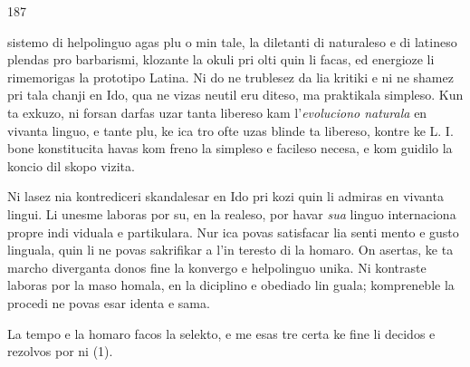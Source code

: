 \begin{VUpage}[191]{187}

\VUcontinue
sistemo di helpolinguo agas plu o min tale, la diletanti di\nl
naturaleso e di latineso plendas pro barbarismi, klozante\nl
la okuli pri olti quin li facas, ed energioze li rimemorigas\nl
la prototipo Latina. Ni do ne trublesez da lia kritiki e ni\nl
ne shamez pri tala chanji en Ido, qua ne vizas neutil eru\cc
diteso, ma praktikala simpleso. Kun ta exkuzo, ni forsan\nl
darfas uzar tanta libereso kam l'\textit{evoluciono naturala} en\nl
vivanta linguo, e tante plu, ke ica tro ofte uzas blinde ta\nl
libereso, kontre ke L. I. bone konstitucita havas kom freno\nl
la simpleso e facileso necesa, e kom guidilo la koncio dil\nl
skopo vizita.

Ni lasez nia kontrediceri skandalesar en Ido pri kozi quin\nl
li admiras en vivanta lingui. Li unesme laboras por su, en\nl
la realeso, por havar \textit{sua} linguo internaciona propre indi\cc
viduala e partikulara. Nur ica povas satisfacar lia senti\cc
mento e gusto linguala, quin li ne povas sakrifikar a l'in\cc
teresto di la homaro. On asertas, ke ta marcho diverganta\nl
donos fine la konvergo e helpolinguo unika. Ni kontraste\nl
laboras por la maso homala, en la diciplino e obediado lin\cc
guala; kompreneble la procedi ne povas esar identa e sama.\parplein

La tempo e la homaro facos la selekto, e me esas tre certa\nl
ke fine li decidos e rezolvos por ni (1).
\end{VUpage}

